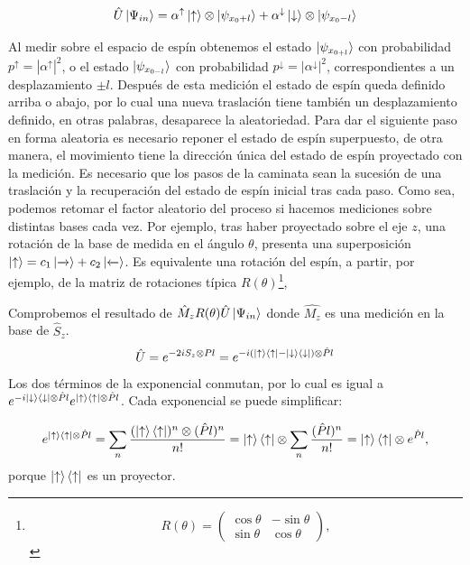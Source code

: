 \begin{equation}
\hat{U}\ket{\Psi_{in}}=\alpha^\uparrow \ket{\uparrow}\otimes\ket{\psi_{x_0+l}}+\alpha^\downarrow\ket{\downarrow}\otimes\ket{\psi_{x_0-l}}
\end{equation}{}

Al medir sobre el espacio de espín obtenemos el estado $\ket{\psi_{x_{0+l}}}$ con probabilidad $p^\uparrow=|\alpha^\uparrow|^2$, o el estado $\ket{\psi_{x_{0-l}}}$ con probabilidad $p^\downarrow=|\alpha^\downarrow|^2$, correspondientes a un desplazamiento $\pm l$. Después de esta medición el estado de espín queda definido arriba o abajo, por lo cual una nueva traslación tiene también un desplazamiento definido, en otras palabras, desaparece la aleatoriedad. 
Para dar el siguiente paso en forma aleatoria es necesario reponer el estado de espín superpuesto, de otra manera, el movimiento tiene la dirección única del estado de espín proyectado con la medición. Es necesario que los pasos de la caminata sean la sucesión de una traslación y la recuperación del estado de espín inicial tras cada paso. Como sea, podemos retomar el factor aleatorio del proceso si hacemos mediciones sobre distintas bases cada vez. Por ejemplo, tras haber proyectado sobre el eje $z$, una rotación de la base de medida en el ángulo $\theta$, presenta una superposición $\ket{\uparrow}=c_1\ket{\xrightarrow{}}+c_2\ket{\xleftarrow{}}$. Es equivalente una rotación del espín, a partir, por ejemplo, de la matriz de rotaciones típica $R(\theta)$\footnote{\begin{equation}
    R(\theta)=
    \begin{pmatrix}
    \cos\theta&-\sin\theta\\
    \sin\theta&\cos\theta
    \end{pmatrix}{},
    \label{MatrizRotaciones}
\end{equation}{}},

Comprobemos el resultado de $\hat{M}_zR(\theta)\hat{U}\ket{\Psi_{in}}$ donde $\hat{M_z}$ es una medición en la base de $\hat{S}_z$.
\begin{equation}
    \hat{U}=e^{-2iS_z\otimes Pl}=e^{-i(\ket{\uparrow}\bra{\uparrow}-\ket{\downarrow}\bra{\downarrow})\otimes \hat{P}l}
\end{equation}{}
Los dos términos de la exponencial conmutan, por lo cual es igual a $e^{-i\ket{\downarrow}\bra{\downarrow}\otimes \hat{P}l}e^{\ket{\uparrow}\bra{\uparrow}\otimes \hat{P}l}$. Cada exponencial se puede simplificar:

\begin{equation}
e^{\ket{\uparrow}\bra{\uparrow}\otimes\hat{P}l}=\sum_n \frac{(\ket{\uparrow}\bra{\uparrow})^n\otimes (\hat{P}l)^n}{n!}=\ket{\uparrow}\bra{\uparrow}\otimes\sum_n\frac{(\hat{P}l)^n}{n!}=\ket{\uparrow}\bra{\uparrow}\otimes e^{\hat{P}l},
\end{equation}
porque $\ket{\uparrow}\bra{\uparrow}$ es un proyector.\\

